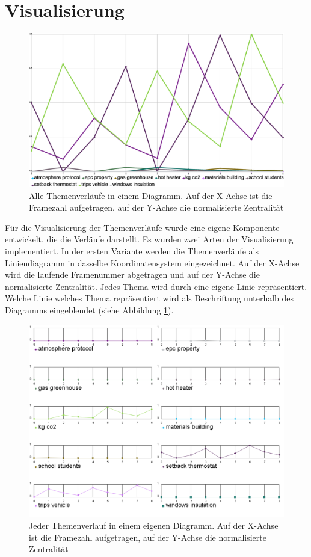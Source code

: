 \section{Visualisierung}
\begin{figure}[ht]
\centering
\includegraphics[width=\textwidth, height=0.5\textheight]{images/content/05_workflowTime/allInOne.eps} 
\caption{Alle Themenverläufe in einem Diagramm. Auf der X-Achse ist die Framezahl aufgetragen, auf der Y-Achse die normalisierte Zentralität}
\label{fig:allInOne}
\end{figure}

Für die Visualisierung der Themenverläufe wurde eine eigene Komponente entwickelt, die die Verläufe darstellt. Es wurden zwei Arten der Visualisierung implementiert. In der ersten Variante werden die Themenverläufe als Liniendiagramm in dasselbe Koordinatensystem eingezeichnet. Auf der X-Achse wird die laufende Framenummer abgetragen und auf der Y-Achse die normalisierte Zentralität. Jedes Thema wird durch eine eigene Linie repräsentiert. Welche Linie welches Thema repräsentiert wird als Beschriftung unterhalb des Diagramms eingeblendet (siehe Abbildung \ref{fig:allInOne}). 

\begin{figure}[ht]
\centering
\includegraphics[width=\textwidth]{images/content/05_workflowTime/separatedViews.eps} 
\caption{Jeder Themenverlauf in einem eigenen Diagramm. Auf der X-Achse ist die Framezahl aufgetragen, auf der Y-Achse die normalisierte Zentralität}
\label{fig:separatedViews}
\end{figure}

